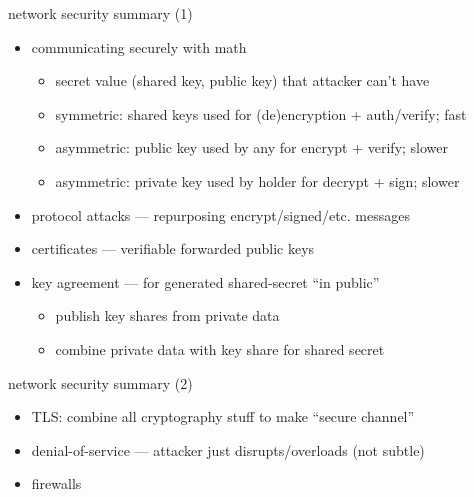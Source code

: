 \begin{frame}{network security summary (1)}
    \begin{itemize}
    \item communicating securely with math
        \begin{itemize}
        \item secret value (shared key, public key) that attacker can't have
        \item symmetric: shared keys used for (de)encryption + auth/verify; fast
        \item asymmetric: public key used by any for encrypt + verify; slower
        \item asymmetric: private key used by holder for decrypt + sign; slower
        \end{itemize}
    \item protocol attacks --- repurposing encrypt/signed/etc. messages
    \item certificates --- verifiable forwarded public keys 
    \item key agreement --- for generated shared-secret ``in public''
        \begin{itemize}
        \item publish key shares from private data
        \item combine private data with key share for shared secret
        \end{itemize}
    \end{itemize}
\end{frame}

\begin{frame}{network security summary (2)}
    \begin{itemize}
    \item TLS: combine all cryptography stuff to make ``secure channel''
    \item denial-of-service --- attacker just disrupts/overloads (not subtle)
    \item firewalls
    \end{itemize}
\end{frame}

